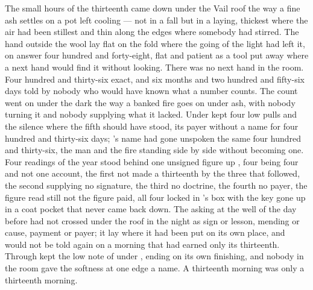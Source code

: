 
The small hours of the thirteenth came down under the Vail roof the way a fine ash settles on a pot left cooling --- not in a fall but in a laying, thickest where the air had been stillest and thin along the edges where somebody had stirred. The hand outside the wool lay flat on the fold where the going of the light had left it, on answer four hundred and forty-eight, flat and patient as a tool put away where a next hand would find it without looking. There was no next hand in the room. Four hundred and thirty-six exact, and six months and two hundred and fifty-six days told by nobody who would have known what a number counts. The count went on under the dark the way a banked fire goes on under ash, with nobody turning it and nobody supplying what it lacked. Under   kept four low pulls and the silence where the fifth should have stood, its payer without a name for four hundred and thirty-six days; 's name had gone unspoken the same four hundred and thirty-six, the man and the fire standing side by side without becoming one. Four readings of the year stood behind one unsigned figure up , four being four and not one account, the first not made a thirteenth by the three that followed, the second supplying no signature, the third no doctrine, the fourth no payer, the figure read still not the figure paid, all four locked in 's box with the key gone up in a coat pocket that never came back down. The asking at the well of the day before had not crossed under the roof in the night as sign or lesson, mending or cause, payment or payer; it lay where it had been put on its own place, and would not be told again on a morning that had earned only its thirteenth. Through   kept the low note of  under , ending on its own finishing, and nobody in the room gave the softness at one edge a name. A thirteenth morning was only a thirteenth morning.


